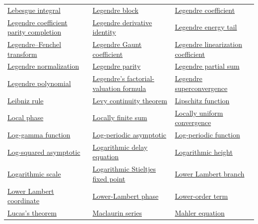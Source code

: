 \documentclass[11pt,oneside]{article}
\begin{document}
\begin{longtable}{L{0.31\textwidth}L{0.31\textwidth}L{0.31\textwidth}}
\hyperlink{gls:lebesgue-integral}{Lebesgue integral} & \hyperlink{gls:legendre-block}{Legendre block} & \hyperlink{gls:legendre-coefficient}{Legendre coefficient} \\
\hyperlink{gls:legendre-coefficient-parity-completion}{Legendre coefficient parity completion} & \hyperlink{gls:legendre-derivative-identity}{Legendre derivative identity} & \hyperlink{gls:legendre-energy-tail}{Legendre energy tail} \\
\hyperlink{gls:legendre-fenchel-transform}{Legendre--Fenchel transform} & \hyperlink{gls:legendre-gaunt-coefficient}{Legendre Gaunt coefficient} & \hyperlink{gls:legendre-linearization-coefficient}{Legendre linearization coefficient} \\
\hyperlink{gls:legendre-normalization}{Legendre normalization} & \hyperlink{gls:legendre-parity}{Legendre parity} & \hyperlink{gls:legendre-partial-sum}{Legendre partial sum} \\
\hyperlink{gls:legendre-polynomial}{Legendre polynomial} & \hyperlink{gls:legendres-factorial-valuation-formula}{Legendre's factorial-valuation formula} & \hyperlink{gls:legendre-superconvergence}{Legendre superconvergence} \\
\hyperlink{gls:leibniz-rule}{Leibniz rule} & \hyperlink{gls:levy-continuity-theorem}{Levy continuity theorem} & \hyperlink{gls:lipschitz-function}{Lipschitz function} \\
\hyperlink{gls:local-phase}{Local phase} & \hyperlink{gls:locally-finite-sum}{Locally finite sum} & \hyperlink{gls:locally-uniform-convergence}{Locally uniform convergence} \\
\hyperlink{gls:gamma-logarithm}{Log-gamma function} & \hyperlink{gls:log-periodic-asymptotic}{Log-periodic asymptotic} & \hyperlink{gls:log-periodic-function}{Log-periodic function} \\
\hyperlink{gls:log-squared-asymptotic}{Log-squared asymptotic} & \hyperlink{gls:logarithmic-delay-equation}{Logarithmic delay equation} & \hyperlink{gls:logarithmic-height}{Logarithmic height} \\
\hyperlink{gls:logarithmic-scale}{Logarithmic scale} & \hyperlink{gls:logarithmic-stieltjes-fixed-point}{Logarithmic Stieltjes fixed point} & \hyperlink{gls:lower-lambert-branch}{Lower Lambert branch} \\
\hyperlink{gls:lower-lambert-coordinate}{Lower Lambert coordinate} & \hyperlink{gls:lower-lambert-phase}{Lower-Lambert phase} & \hyperlink{gls:lower-order-term}{Lower-order term} \\
\hyperlink{gls:lucas-theorem}{Lucas's theorem} & \hyperlink{gls:maclaurin-series}{Maclaurin series} & \hyperlink{gls:mahler-equation}{Mahler equation} \\

\end{longtable}
\end{document}

